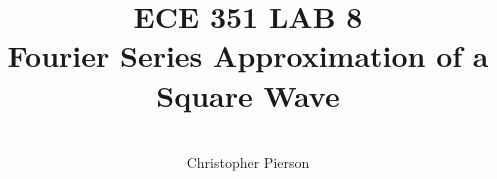 



\documentclass[12pt]{article}

\usepackage[english]{babel}
\usepackage[utf8x]{inputenc}
\usepackage[T1]{fontenc}
\usepackage{graphicx}
\usepackage{amsmath}
\usepackage{caption}
\usepackage{float}
\usepackage{caption}
\usepackage{subcaption}
\usepackage{rotating}
\usepackage{setspace}

\usepackage[a4paper,top=3cm,bottom=2cm,left=3cm,right=3cm,marginparwidth=1.75cm]{geometry}

\usepackage[colorinlistoftodos]{todonotes}
\usepackage[colorlinks=true, allcolors=blue]{hyperref}
\usepackage{listings}
\usepackage{gensymb}
\usepackage{ mathrsfs }



\title{%
	\textbf{ ECE 351 LAB 8} \\
 Fourier Series Approximation of a Square Wave 
	 }

\author{\\
	Christopher Pierson}

	
	
\vspace{\fill}
\maketitle
\vspace{\fill}
\clearpage

